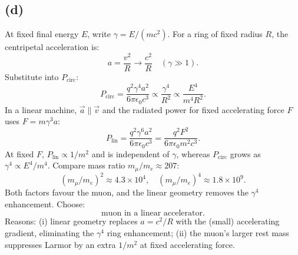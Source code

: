 \documentclass[11pt]{article}
\begin{document}
\subsection*{(d)}
At fixed final energy $E$, write $\gamma=E/(mc^{2})$. For a ring of fixed radius $R$, the centripetal acceleration is:
\[ a=\frac{v^{2}}{R}\to\frac{c^{2}}{R}\quad(\gamma\gg 1). \]
Substitute into $P_{\mathrm{circ}}$:
\[ P_{\mathrm{circ}}=\frac{q^{2}\gamma^{4}a^{2}}{6\pi\epsilon_{0}c^{3}}\propto\frac{\gamma^{4}}{R^{2}}\propto\frac{E^{4}}{m^{4}R^{2}}. \]
In a linear machine, $\vec a\parallel\vec v$ and the radiated power for fixed accelerating force $F$ uses $F=m\gamma^{3}a$:
\[ P_{\mathrm{lin}}=\frac{q^{2}\gamma^{6}a^{2}}{6\pi\epsilon_{0}c^{3}}=\frac{q^{2}F^{2}}{6\pi\epsilon_{0}m^{2}c^{3}}. \]
At fixed $F$, $P_{\mathrm{lin}}\propto 1/m^{2}$ and is independent of $\gamma$, whereas $P_{\mathrm{circ}}$ grows as $\gamma^{4}\propto E^{4}/m^{4}$. Compare mass ratio $m_{\mu}/m_{e}\approx 207$:
\[ (m_{\mu}/m_{e})^{2}\approx 4.3\times 10^{4},\quad (m_{\mu}/m_{e})^{4}\approx 1.8\times 10^{9}. \]
Both factors favour the muon, and the linear geometry removes the $\gamma^{4}$ enhancement. Choose:
\[ \boxed{\;\text{muon in a linear accelerator}.\;} \]
Reasons: (i) linear geometry replaces $a=c^{2}/R$ with the (small) accelerating gradient, eliminating the $\gamma^{4}$ ring enhancement; (ii) the muon's larger rest mass suppresses Larmor by an extra $1/m^{2}$ at fixed accelerating force.
\end{document}
